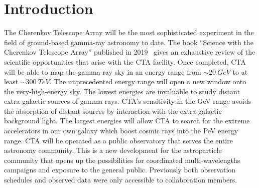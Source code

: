 \chapter{Introduction}
\label{ch:cta}

The Cherenkov Telescope Array will be the most sophisticated experiment in the field of ground-based gamma-ray astronomy to date.
The book \enquote{Science with the Cherenkov Telescope Array} published in 2019~\cite{cta:science} gives an exhaustive review 
of the scientific opportunities that arise with the CTA facility.
Once completed, CTA will be able to map the gamma-ray sky in an energy range from $\sim\SI{20}{GeV}$ to at least $\sim\SI{300}{TeV}$.
The unprecedented energy range will open a new window onto the very-high-energy sky. 
The lowest energies are invaluable to study distant extra-galactic sources of gamma rays. 
CTA's sensitivity in the \si{GeV} range avoids the absorption of distant sources by interaction with the extra-galactic background light.  
The largest energies will allow CTA to search for the extreme accelerators in our own galaxy which boost cosmic rays 
into the \si{PeV} energy range. 
CTA will be operated as a public observatory that serves the entire astronomy community. This is a new development for the astroparticle
community that opens up the possibilities for coordinated multi-wavelengths campaigns and exposure to the general public. Previously both observation schedules and 
observed data were only accessible to collaboration members. 

